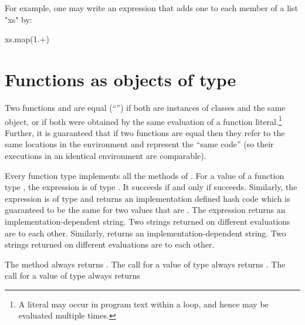 

For example,
one may write an expression that adds one to each member of a
list \xcd"xs" by:

\begin{xten}
xs.map(1.+)
\end{xten}

\section{Functions as objects of type }
\label{FunctionAnyMethods}

\label{FunctionEquality}
Two functions  and  are equal (``\Xcd{==}'') if both are
instances of classes and the same object, or if both were obtained by
the same evaluation of a function literal.\footnote{A literal may
  occur in program text within a loop, and hence may be evaluated
  multiple times.} Further, it is guaranteed that if two functions are
equal then they refer to the same locations in the environment and
represent the ``same code'' (so their executions in an identical
environment are comparable).


Every function type implements all the methods of .
For a value  of a function type , 
the expression  is of type .
It succeeds if and only if  succeeds. Similarly, the 
expression  is of type  and returns
an implementation defined hash code which is guaranteed to be the
same for two values that are . The expression
 returns an implementation-dependent string.
Two strings returned on different evaluations are  to each other. 
Similarly,   returns an implementation-dependent string.
Two strings returned on different evaluations are  to each other. 

The method  always returns . The call
 for  a value of type  always returns
. The call 
 for  a value of type  always returns

